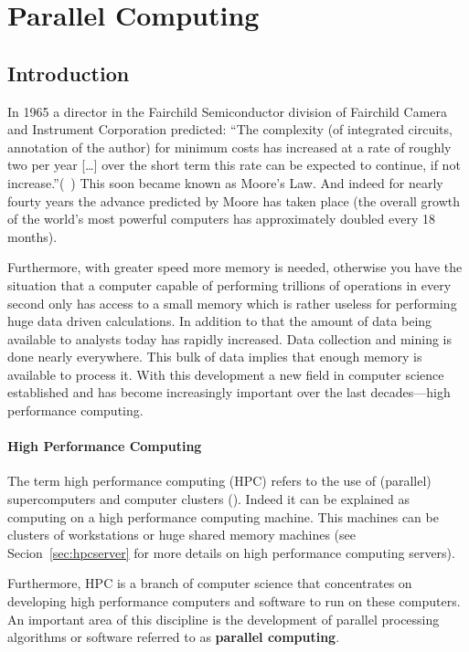 \chapter{Parallel Computing}
\label{chap:parallelcomputing}
\section{Introduction}
\label{sec:parallelintro}
In 1965 a director in the Fairchild Semiconductor division of
Fairchild Camera and Instrument Corporation predicted: ``The complexity
(of integrated circuits, annotation of the author)
for minimum costs has increased at a rate of roughly two per year
[\ldots] over the short term this rate can be expected to continue, if
not increase.''(~\cite{moore65integratedcircuits}) This soon became known
as Moore's Law. And 
indeed for nearly fourty years the advance predicted by Moore has
taken place (the overall growth of the world's most powerful computers
has approximately doubled every 18 months).

Furthermore, with greater speed more memory is needed, otherwise you have
the situation that a computer capable of performing trillions of
operations in every second only has access to a small memory which is
rather useless for performing huge data driven calculations. In addition to
that the amount of data being available to analysts today has rapidly
increased. Data collection and mining is done nearly everywhere. This
bulk of data implies that enough memory is available to process
it. With this development a new field in computer science established
and has become increasingly important over the last decades---high
performance computing.

\subsubsection{High Performance Computing}

The term high performance computing (HPC) refers to the use of (parallel)
supercomputers and computer clusters (\cite{wiki:hpc}). Indeed it can
be explained as computing on a high performance computing
machine. This machines can be clusters of workstations or huge shared
memory machines (see Secion~\ref{sec:hpcserver} for more details on
high performance computing servers).

Furthermore, HPC is a branch of computer science that concentrates on
developing high performance computers and software to run on these
computers. An important area of this discipline is the development of
parallel processing algorithms or software referred to as
\textbf{parallel computing}.
 
